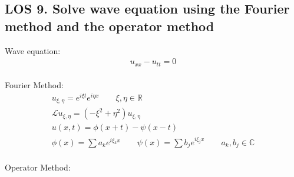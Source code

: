 \documentclass[12pt, a4paper]{article}
\begin{document}
\subsection*{LOS 9. Solve wave equation using the Fourier method and the operator method}
Wave equation:
\begin{gather*}
    u_{xx} - u_{tt} = 0
\end{gather*} \\
Fourier Method:
\begin{gather*}
    u_{\xi, \eta} = e^{i\xi t}e^{i\eta x} \qquad \xi, \eta \in \mathbb{R}    \\
    \mathcal{L} u_{\xi, \eta} = (-\xi^2 + \eta^2)u_{\xi, \eta} \\ 
    u(x, t) = \phi(x+t) - \psi(x-t) \\
    \phi(x) = \sum a_ke^{i\xi_k x} \qquad \psi(x) = \sum b_je^{i\xi_j x} \qquad a_k, b_j \in \mathbb{C} 
\end{gather*} \\
Operator Method:
\end{document}
